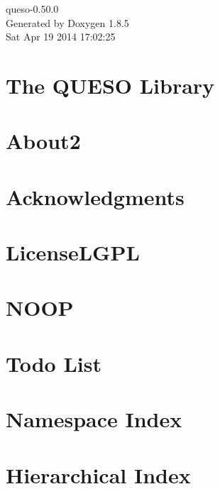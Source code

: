 \documentclass[twoside]{book}
\newcommand{\clearemptydoublepage}{%
  \newpage{\pagestyle{empty}\cleardoublepage}%
}
\begin{document}
\hypersetup{pageanchor=false}
\begin{titlepage}
\vspace*{7cm}
\begin{center}%
{\Large queso-\/0.50.0 }\\
\vspace*{1cm}
{\large Generated by Doxygen 1.8.5}\\
\vspace*{0.5cm}
{\small Sat Apr 19 2014 17:02:25}\\
\end{center}
\end{titlepage}
\clearemptydoublepage
\tableofcontents
\clearemptydoublepage
{}
\hypersetup{pageanchor=true}

\chapter{The Q\-U\-E\-S\-O Library}
\label{index}\hypertarget{index}{}
\chapter{About2}
\label{_about2}
\hypertarget{_about2}{}

\chapter{Acknowledgments}
\label{_acknowledgments}
\hypertarget{_acknowledgments}{}

\chapter{License\-L\-G\-P\-L}
\label{_license_l_g_p_l}
\hypertarget{_license_l_g_p_l}{}

\chapter{N\-O\-O\-P}
\label{_n_o_o_p}
\hypertarget{_n_o_o_p}{}

\chapter{Todo List}
\label{todo}
\hypertarget{todo}{}

\chapter{Namespace Index}

\chapter{Hierarchical Index}

\end{document}
